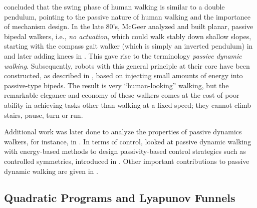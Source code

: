 \cite{Mochon198049} concluded that the swing phase of human walking is similar to a double pendulum, pointing to the passive nature of human walking and the importance of mechanism design.
%
In the late 80's, McGeer analyzed and built planar, passive bipedal walkers, i.e., {\em no actuation}, which could walk stably down shallow slopes, starting with the compass gait walker (which is simply an inverted pendulum) in \cite{MC90} and later adding knees in \cite{mcgeer:kneed}.
%
This gave rise to the terminology {\em passive dynamic walking}.
%
Subsequently, robots with this general principle at their core have been constructed, as described in \cite{CORUTEWI05}, based on injecting small amounts of energy into passive-type bipeds.
%
The result is very ``human-looking'' walking, but the remarkable elegance and economy of these walkers comes at the cost of poor ability in achieving tasks other than walking at a fixed speed; they cannot climb stairs, pause, turn or run.
%

Additional work was later done to analyze the properties of passive dynamics walkers, for instance, in \cite{ESGO94,GACHRUCO98,BORZOVAE04}.
%
In terms of control, \cite{SP99} looked at passive dynamic walking with energy-based methods to design passivity-based control strategies such as controlled symmetries, introduced in \cite{SPBU05}.
%
%
%
Other important contributions to passive dynamic walking are given in \cite{KUO99,KUO02,ANDERSONS05,WIVDL07}.
%

\subsection{Quadratic Programs and Lyapunov Funnels}


